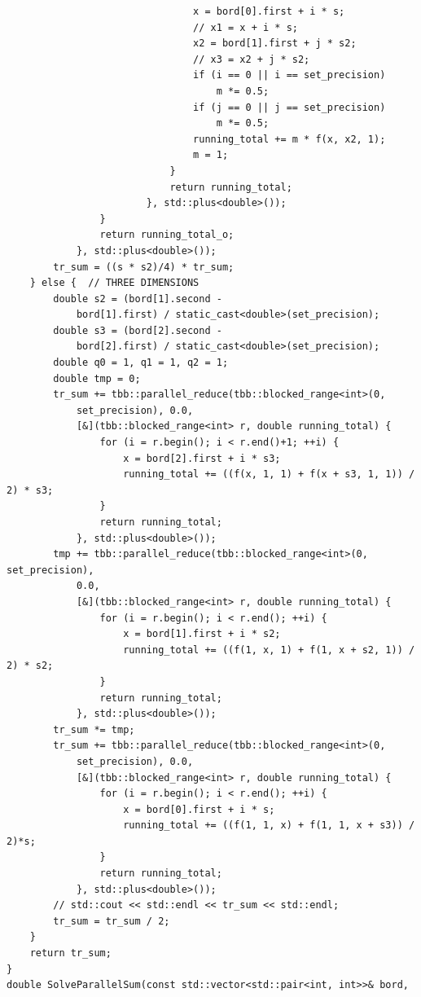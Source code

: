 \documentclass{report}
\begin{document}
\begin{verbatim}
                                x = bord[0].first + i * s;
                                // x1 = x + i * s;
                                x2 = bord[1].first + j * s2;
                                // x3 = x2 + j * s2;
                                if (i == 0 || i == set_precision)
                                    m *= 0.5;
                                if (j == 0 || j == set_precision)
                                    m *= 0.5;
                                running_total += m * f(x, x2, 1);
                                m = 1;
                            }
                            return running_total;
                        }, std::plus<double>());
                }
                return running_total_o;
            }, std::plus<double>());
        tr_sum = ((s * s2)/4) * tr_sum;
    } else {  // THREE DIMENSIONS
        double s2 = (bord[1].second -
            bord[1].first) / static_cast<double>(set_precision);
        double s3 = (bord[2].second -
            bord[2].first) / static_cast<double>(set_precision);
        double q0 = 1, q1 = 1, q2 = 1;
        double tmp = 0;
        tr_sum += tbb::parallel_reduce(tbb::blocked_range<int>(0,
            set_precision), 0.0,
            [&](tbb::blocked_range<int> r, double running_total) {
                for (i = r.begin(); i < r.end()+1; ++i) {
                    x = bord[2].first + i * s3;
                    running_total += ((f(x, 1, 1) + f(x + s3, 1, 1)) / 2) * s3;
                }
                return running_total;
            }, std::plus<double>());
        tmp += tbb::parallel_reduce(tbb::blocked_range<int>(0, set_precision),
            0.0,
            [&](tbb::blocked_range<int> r, double running_total) {
                for (i = r.begin(); i < r.end(); ++i) {
                    x = bord[1].first + i * s2;
                    running_total += ((f(1, x, 1) + f(1, x + s2, 1)) / 2) * s2;
                }
                return running_total;
            }, std::plus<double>());
        tr_sum *= tmp;
        tr_sum += tbb::parallel_reduce(tbb::blocked_range<int>(0,
            set_precision), 0.0,
            [&](tbb::blocked_range<int> r, double running_total) {
                for (i = r.begin(); i < r.end(); ++i) {
                    x = bord[0].first + i * s;
                    running_total += ((f(1, 1, x) + f(1, 1, x + s3)) / 2)*s;
                }
                return running_total;
            }, std::plus<double>());
        // std::cout << std::endl << tr_sum << std::endl;
        tr_sum = tr_sum / 2;
    }
    return tr_sum;
}
double SolveParallelSum(const std::vector<std::pair<int, int>>& bord,

\end{verbatim}
\end{document}
